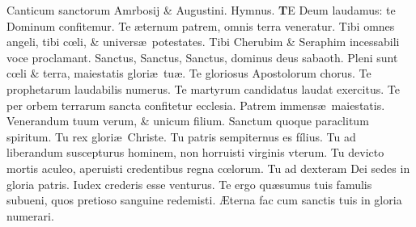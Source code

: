 \documentclass[a5paper,10pt]{book}
\def\ae{æ}
\def\AE{Æ}
\def\oe{œ}
\begin{document}
\begin{multicols*}{2}
\newline {} \color{red} Canticum sanctorum Amrbosij \& Augustini. Hymnus. \color{black}
\vspace{-1em}
\lettrine[lines=2]{\bfseries \color{red} T}{}E Deum laudamus: te Dominum confitemur.
\newline \color{red} T\color{black}e \ae ternum patrem, omnis terra veneratur.
\newline \color{red} T\color{black}ibi omnes angeli,  tibi c\oe li, \& univers\ae\ potestates.
\newline \color{red} T\color{black}ibi Cherubim \& Seraphim incessabili voce proclamant.
\newline \color{red} S\color{black}anctus, Sanctus, Sanctus, dominus deus sabaoth.
\newline \color{red} P\color{black}leni sunt c\oe li \& terra, maiestatis glori\ae \ tu\ae .
\newline \color{red} T\color{black}e gloriosus Apostolorum chorus.
\newline \color{red} T\color{black}e prophetarum laudabilis numerus.
\newline \color{red} T\color{black}e martyrum candidatus laudat exercitus.
\newline \color{red} T\color{black}e per orbem terrarum sancta confitetur ecclesia.
\newline \color{red} P\color{black}atrem  immens\ae \ maiestatis.
\newline \color{red} V\color{black}enerandum tuum verum, \& unicum filium.
\newline \color{red} S\color{black}anctum quoque paraclitum spiritum.
\newline \color{red} T\color{black}u rex glori\ae \ Christe.
\newline \color{red} T\color{black}u patris sempiternus es fílius.
\newline \color{red} T\color{black}u ad liberandum suscepturus hominem, non horruisti virginis vterum.
\newline \color{red} T\color{black}u devicto mortis aculeo, aperuisti credentibus regna c\oe lorum.
\newline \color{red} T\color{black}u ad dexteram Dei sedes in gloria patris.
\newline \color{red} I\color{black}udex crederis esse venturus.
\newline \color{red} T\color{black}e ergo qu\ae sumus tuis famulis subueni, quos pretioso sanguine redemisti.
\newline \color{red} \AE \color{black}terna fac cum sanctis tuis in gloria numerari.

\end{multicols*}
\end{document}
